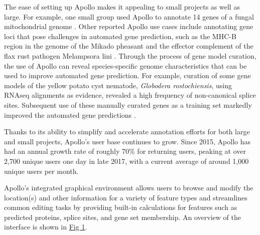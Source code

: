 The ease of setting up Apollo makes it appealing to small projects as
well as large. For example, one small group used Apollo to annotate 14
genes of a fungal mitochondrial genome \cite{Jelen_2016}. Other reported Apollo
use cases include annotating gene loci that pose challenges in automated
gene prediction, such as the MHC-B region in the genome of the Mikado
pheasant \cite{Lee_2018} and the effector complement of the flax rust pathogen
Melampsora lini \cite{Nemri_2014}. Through the process of gene model curation,
the use of Apollo can reveal species-specific genome characteristics
that can be used to improve automated gene prediction. For example,
curation of some gene models of the yellow potato cyst nematode,
\emph{Globodera rostochiensis}, using RNAseq alignments as evidence,
revealed a high frequency of non-canonical splice sites. Subsequent use
of these manually curated genes as a training set markedly improved the
automated gene predictions \cite{Eves_van_den_Akker_2016}.

Thanks to its ability to simplify and accelerate annotation efforts for
both large and small projects, Apollo's user base continues to grow.
Since 2015, Apollo has had an annual growth rate of roughly 70\% for
returning users, peaking at over 2,700 unique users one day in late
2017, with a current average of around 1,000 unique users per month.

Apollo's integrated graphical environment allows users to browse and
modify the location(s) and other information for a variety of feature
types and streamlines common editing tasks by providing built-in
calculations for features such as predicted proteins, splice sites, and
gene set membership. An overview of the interface is shown in
\protect\hyperlink{pcbi.1006790.g001}{Fig 1}.

